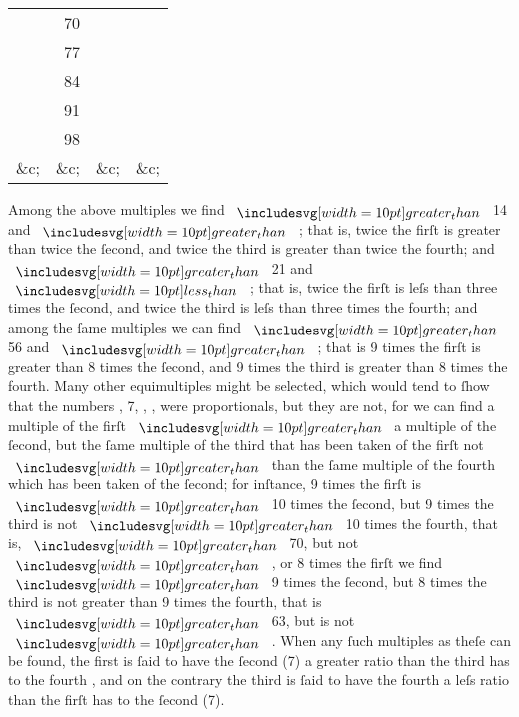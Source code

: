 \documentclass[12pt,preview]{standalone}
\begin{document}
\begin{center}
\begin{tabular}{ |c|c|c|c| }
        \multicolumn{1}{|r|}{{\color{cred}{80}}}  & \multicolumn{1}{|r|}{70}   & \multicolumn{1}{|r|}{{\color{cblue}{100}}} & \multicolumn{1}{|r|}{{\color{cyellow}{90}}}  \\
        \multicolumn{1}{|r|}{{\color{cred}{88}}}  & \multicolumn{1}{|r|}{77}   & \multicolumn{1}{|r|}{{\color{cblue}{110}}} & \multicolumn{1}{|r|}{{\color{cyellow}{99}}}  \\
        \multicolumn{1}{|r|}{{\color{cred}{96}}}  & \multicolumn{1}{|r|}{84}   & \multicolumn{1}{|r|}{{\color{cblue}{120}}} & \multicolumn{1}{|r|}{{\color{cyellow}{108}}} \\
        \multicolumn{1}{|r|}{{\color{cred}{104}}} & \multicolumn{1}{|r|}{91}   & \multicolumn{1}{|r|}{{\color{cblue}{130}}} & \multicolumn{1}{|r|}{{\color{cyellow}{117}}} \\
        \multicolumn{1}{|r|}{{\color{cred}{112}}} & \multicolumn{1}{|r|}{98}   & \multicolumn{1}{|r|}{{\color{cblue}{140}}} & \multicolumn{1}{|r|}{{\color{cyellow}{126}}} \\
        \multicolumn{1}{|r|}{\&c;}                & \multicolumn{1}{|r|}{\&c;} & \multicolumn{1}{|r|}{\&c;}                 & \multicolumn{1}{|r|}{\&c;}                   \\
        \hline
    \end{tabular}
\end{center}

Among the above multiples we find {\color{cred}{16}} $\bgt$ 14 and {\color{cblue}{20}} $\bgt$ {\color{cyellow}{18}}; that is, twice the firſt is greater than twice the ſecond, and twice the third is greater than twice the fourth; and {\color{cred}{16}} $\bgt$ 21 and {\color{cblue}{20}} $\blt$ {\color{cyellow}{27}}; that is, twice the firſt is leſs than three times the ſecond, and twice the third is leſs than three times the fourth; and among the ſame multiples we can find {\color{cred}{72}} $\bgt$ 56 and {\color{cblue}{90}} $\bgt$ {\color{cyellow}{72}}; that is 9 times the firſt is greater than 8 times the ſecond, and 9 times the third is greater than 8 times the fourth. Many other equimultiples might be selected, which would tend to ſhow that the numbers {\color{cred}{8}}, 7, {\color{cblue}{10}}, {\color{cyellow}{9}}, were proportionals, but they are not, for we can find a multiple of the firſt $\bgt$ a multiple of the ſecond, but the ſame multiple of the third that has been taken of the firſt not $\bgt$ than the ſame multiple of the fourth which has been taken of the ſecond; for inſtance, 9 times the firſt is $\bgt$ 10 times the ſecond, but 9 times the third is not $\bgt$ 10 times the fourth, that is, {\color{cred}{72}} $\bgt$ 70, but {\color{cblue}{90}} not $\bgt$ {\color{cyellow}{90}}, or 8 times the firſt we find $\bgt$ 9 times the ſecond, but 8 times the third is not greater than 9 times the fourth, that is {\color{cred}{64}} $\bgt$ 63, but {\color{cblue}{80}} is not $\bgt$ {\color{cyellow}{81}}. When any ſuch multiples as theſe can be found, the first {\color{cred}{(8)}} is ſaid to have the ſecond (7) a greater ratio than the third {\color{cblue}{(10)}} has to the fourth {\color{cyellow}{(9)}}, and on the contrary the third {\color{cblue}{(10)}} is ſaid to have the fourth {\color{cyellow}{(9)}} a leſs ratio than the firſt {\color{cred}{(8)}} has to the ſecond (7).
\end{document}

